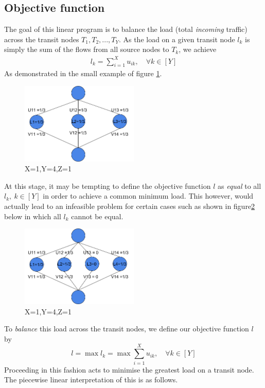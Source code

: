 \documentclass[12pt,twoside]{article}
\begin{document}
\subsection{Objective function}\label{Sec: objf}
The goal of this linear program is to balance the load (total \emph{incoming} traffic) across the transit nodes $T_1,T_2,...,T_Y$. As the load on a given transit node $l_k$ is simply the sum of the flows from all source nodes to $T_k$, we achieve
\begin{align*}
	l_k  = \sum_{i=1}^{X}u_{ik},   \quad  \forall k \in [Y]
\end{align*}
As demonstrated in the small example of figure \ref{131}.
\clearpage
\begin{figure}[htb]
	\centering
	\includegraphics[width=0.5\textwidth]{131.png}
	\caption{X=1,Y=4,Z=1}
	\label{131}
\end{figure}%

At this stage, it may be tempting to define the objective function $l$ as \emph{equal} to all $l_k, \ k \in [Y]$ in order to achieve a common minimum load. This however, would actually lead to an infeasible problem for certain cases such as shown in figure\ref{141} below in which all $l_k$ cannot be equal.
\begin{figure}[htb]
	\centering
	\includegraphics[width=0.5\textwidth]{141.png}
	\caption{X=1,Y=4,Z=1}
	\label{141}
\end{figure}%

To \emph{balance} this load across the transit nodes, we define our objective function $l$ by
\begin{equation*}
 l = \max{l_k} = \max{\sum_{i=1}^{X}u_{ik}},   \quad  \forall k \in [Y]
\end{equation*}
Proceeding in this fashion acts to minimise the greatest load on a transit node. The piecewise linear interpretation of this is as follows.
\end{document}
